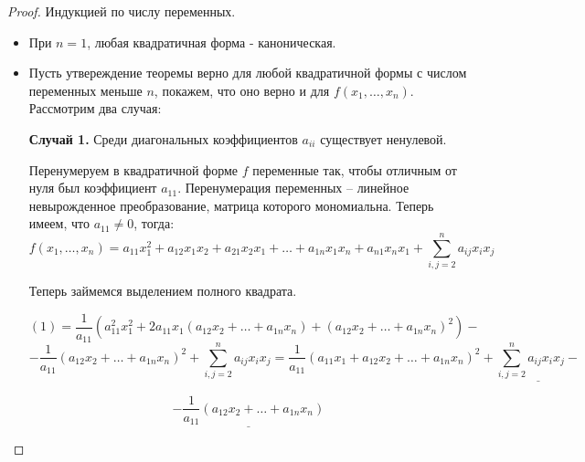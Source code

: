 \documentclass[../../main.tex]{subfiles}
\begin{document}
\begin{proof}
Индукцией по числу переменных.

\begin{itemize}
	
	\item При $n = 1$, любая квадратичная форма - каноническая.
	
	\item Пусть утвереждение теоремы верно для любой квадратичной формы с числом переменных меньше $n$, покажем, что оно верно и для $f(x_{1}, \dots, x_{n})$. Рассмотрим два случая:

	\textbf{Случай 1.} Среди диагональных коэффициентов $a_{i i}$ существует ненулевой. 

	Перенумеруем в квадратичной форме $f$ переменные так, чтобы отличным от нуля был коэффициент $a_{1 1}$. Перенумерация переменных -- линейное невырожденное преобразование, матрица которого мономиальна. Теперь имеем, что $a_{1 1} \ne 0$, тогда:
	\begin{equation}
		f(x_{1}, \dots, x_{n}) = a_{1 1} x^{2}_{1} + a_{1 2} x_{1} x_{2} + a_{2 1} x_{2} x_{1} + \dots + a_{1 n} x_{1} x_{n} + a_{n 1} x_{n} x_{1} + \sum^{n}_{i, j = 2} a_{i j} x_{i} x_{j}
	\end{equation}

	Теперь займемся выделением полного квадрата.

	\[
		(1) = \frac{1}{a_{1 1}} \left( a^{2}_{1 1} x^{2}_{1} + 2 a_{1 1} x_{1} (a_{1 2} x_{2} + \dots + a_{1 n} x_{n}) + (a_{1 2}x_{2} + \dots + a_{1 n} x_{n}) ^ {2}\right) - 
	\]
	\[
		- \frac{1}{a_{1 1}}\left( a_{1 2} x_{2} + \dots + a_{1 n} x_{n}\right)^{2} + \sum^{n}_{i, j = 2} a_{i j} x_{i} x_{j} = \frac{1}{a_{1 1}} \left( a_{1 1} x_{1} + a_{1 2} x_{2} + \dots + a_{1 n} x_{n} \right) ^{2} + \underline{\sum^{n}_{i, j = 2} a_{i j}x_{i} x_{j} - }
	\]
	
	\begin{equation}
		\underline{- \frac{1}{a_{1 1}}\left( a_{1 2} x_{2} + \dots + a_{1 n} x_{n}\right)}
	\end{equation}
	

\end{itemize}
\end{proof}
\end{document}
